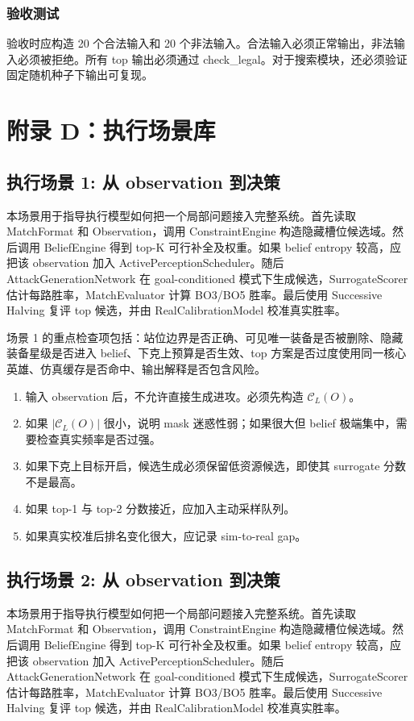 \documentclass[UTF8,12pt,openany]{ctexbook}
\newcommand{\Ccal}{\mathcal{C}}
\begin{document}
\subsection{验收测试}
验收时应构造 20 个合法输入和 20 个非法输入。合法输入必须正常输出，非法输入必须被拒绝。所有 top 输出必须通过 check\_legal。对于搜索模块，还必须验证固定随机种子下输出可复现。


\chapter{附录 D：执行场景库}

\section{执行场景 1: 从 observation 到决策}
本场景用于指导执行模型如何把一个局部问题接入完整系统。首先读取 MatchFormat 和 Observation，调用 ConstraintEngine 构造隐藏槽位候选域。然后调用 BeliefEngine 得到 top-K 可行补全及权重。如果 belief entropy 较高，应把该 observation 加入 ActivePerceptionScheduler。随后 AttackGenerationNetwork 在 goal-conditioned 模式下生成候选，SurrogateScorer 估计每路胜率，MatchEvaluator 计算 BO3/BO5 胜率。最后使用 Successive Halving 复评 top 候选，并由 RealCalibrationModel 校准真实胜率。

场景 1 的重点检查项包括：站位边界是否正确、可见唯一装备是否被删除、隐藏装备星级是否进入 belief、下克上预算是否生效、top 方案是否过度使用同一核心英雄、仿真缓存是否命中、输出解释是否包含风险。

\begin{enumerate}[leftmargin=2em]
\item 输入 observation 后，不允许直接生成进攻。必须先构造 $\Ccal_L(O)$。
\item 如果 $|\Ccal_L(O)|$ 很小，说明 mask 迷惑性弱；如果很大但 belief 极端集中，需要检查真实频率是否过强。
\item 如果下克上目标开启，候选生成必须保留低资源候选，即使其 surrogate 分数不是最高。
\item 如果 top-1 与 top-2 分数接近，应加入主动采样队列。
\item 如果真实校准后排名变化很大，应记录 sim-to-real gap。
\end{enumerate}


\section{执行场景 2: 从 observation 到决策}
本场景用于指导执行模型如何把一个局部问题接入完整系统。首先读取 MatchFormat 和 Observation，调用 ConstraintEngine 构造隐藏槽位候选域。然后调用 BeliefEngine 得到 top-K 可行补全及权重。如果 belief entropy 较高，应把该 observation 加入 ActivePerceptionScheduler。随后 AttackGenerationNetwork 在 goal-conditioned 模式下生成候选，SurrogateScorer 估计每路胜率，MatchEvaluator 计算 BO3/BO5 胜率。最后使用 Successive Halving 复评 top 候选，并由 RealCalibrationModel 校准真实胜率。
\end{document}
